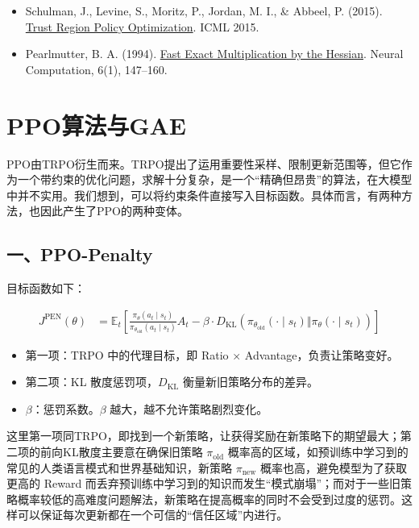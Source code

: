 \vspace{0.25em}
\begin{itemize}
\tightlist
\item
  Schulman, J., Levine, S., Moritz, P., Jordan, M. I., \& Abbeel, P. (2015). \href{https://arxiv.org/abs/1502.05477}{Trust Region Policy Optimization}. ICML 2015.
\item
  Pearlmutter, B. A. (1994). \href{https://doi.org/10.1162/neco.1994.6.1.147}{Fast Exact Multiplication by the Hessian}. Neural Computation, 6(1), 147--160.
\end{itemize}

\clearpage

\hypertarget{ppoux7b97ux6cd5ux4e0egae}{%
\section{PPO算法与GAE}\label{ppoux7b97ux6cd5ux4e0egae}}

PPO由TRPO衍生而来。TRPO提出了运用重要性采样、限制更新范围等，但它作为一个带约束的优化问题，求解十分复杂，是一个``精确但昂贵''的算法，在大模型中并不实用。我们想到，可以将约束条件直接写入目标函数。具体而言，有两种方法，也因此产生了PPO的两种变体。

\hypertarget{ux4e00ppo-penalty}{%
\subsection{一、PPO-Penalty}\label{ux4e00ppo-penalty}}

目标函数如下：

\[
\begin{aligned}
J^{\mathrm{PEN}}(\theta)
&=
\mathbb{E}_t\left[
\frac{\pi_\theta(a_t\mid s_t)}
{\pi_{\theta_{\mathrm{old}}}(a_t\mid s_t)}
A_t
-
\beta\cdot
D_{\mathrm{KL}}\left(
\pi_{\theta_{\mathrm{old}}}(\cdot\mid s_t)
\Vert
\pi_\theta(\cdot\mid s_t)
\right)
\right]
\end{aligned}
\]

\begin{itemize}
\tightlist
\item
  第一项：TRPO 中的代理目标，即 Ratio \(\times\) Advantage，负责让策略变好。
\item
  第二项：KL 散度惩罚项，\(D_{\mathrm{KL}}\) 衡量新旧策略分布的差异。
\item
  \(\beta\)：惩罚系数。\(\beta\) 越大，越不允许策略剧烈变化。
\end{itemize}

这里第一项同TRPO，即找到一个新策略，让获得奖励在新策略下的期望最大；第二项的前向KL散度主要意在确保旧策略 \(\pi_{\mathrm{old}}\) 概率高的区域，如预训练中学习到的常见的人类语言模式和世界基础知识，新策略 \(\pi_{\mathrm{new}}\) 概率也高，避免模型为了获取更高的 Reward 而丢弃预训练中学习到的知识而发生``模式崩塌''；而对于一些旧策略概率较低的高难度问题解法，新策略在提高概率的同时不会受到过度的惩罚。这样可以保证每次更新都在一个可信的``信任区域''内进行。


